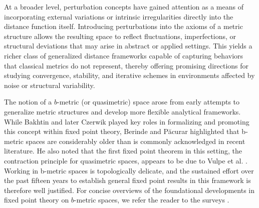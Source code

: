 \documentclass[sn-mathphys-num]{sn-jnl}%
\theoremstyle{thmstyleone}%
\theoremstyle{thmstyletwo}%
\theoremstyle{thmstylethree}%
\numberwithin{equation}{section}
\begin{document}
At a broader level, perturbation concepts have gained attention as a means of incorporating external variations or intrinsic irregularities directly into the distance function itself. Introducing perturbations into the axioms of a metric structure allows the resulting space to reflect fluctuations, imperfections, or structural deviations that may arise in abstract or applied settings. This yields a richer class of generalized distance frameworks capable of capturing behaviors that classical metrics do not represent, thereby offering promising directions for studying convergence, stability, and iterative schemes in environments affected by noise or structural variability.

The notion of a $b$-metric (or quasimetric) space arose from early attempts to generalize metric structures and develop more flexible analytical frameworks. While Bakhtin \cite{bmetric1} and later Czerwik \cite{bmetric2} played key roles in formalizing and promoting this concept within fixed point theory, Berinde and Păcurar \cite{vasile} highlighted that b-metric spaces are considerably older than is commonly acknowledged in recent literature. He also noted that the first fixed point theorem in this setting, the contraction principle for quasimetric spaces, appears to be due to Vulpe et al. \cite{Vulpe}. Working in b-metric spaces is topologically delicate, and the sustained effort over the past fifteen years to establish general fixed point results in this framework is therefore well justified. For concise overviews of the foundational developments in fixed point theory on $b$-metric spaces, we refer the reader to the surveys \cite{vasile,bmetricsurvey}.
\end{document}
